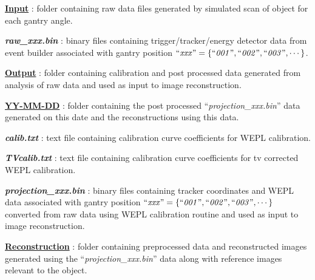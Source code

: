 \documentclass[landscape]{article}
\begin{document}
\begin{myEnumerate}[labelindent=0pt, leftmargin=*]
\begin{myEnumerate}[labelindent=1pt, leftmargin=*]
\begin{myEnumerate}[labelindent=1pt, leftmargin=*]
\begin{myEnumerate}[labelindent=1pt, leftmargin=*]
                \begin{myEnumerate}[labelindent=1pt, leftmargin=*]
                    \item \ul{\textbf{Input}} : folder containing raw data files generated by simulated scan of object for each gantry angle.
                    \begin{myEnumerate}[labelindent=1pt, leftmargin=*]
                        \item \textbf{\textit{raw\_xxx.bin}} : binary files containing trigger/tracker/energy detector data from event builder associated with gantry position $\textrm{``\textit{xxx}''} =\{\textrm{``\textit{001}''}, \textrm{``\textit{002}''}, \textrm{``\textit{003}''}, \cdots\}$.
                    \end{myEnumerate}
                    \item \ul{\textbf{Output}} : folder containing calibration and post processed data generated from analysis of raw data and used as input to image reconstruction.
                    \begin{myEnumerate}[labelindent=1pt, leftmargin=*]
                        \item \ul{\textbf{YY-MM-DD}} : folder containing the post processed ``\textit{projection\_xxx.bin}'' data generated on this date and the reconstructions using this data.
                        \begin{myEnumerate}[labelindent=1pt, leftmargin=*]
                            \item \textbf{\textit{calib.txt}} : text file containing calibration curve coefficients for WEPL calibration.
                            \item \textbf{\textit{TVcalib.txt}} : text file containing calibration curve coefficients for tv corrected WEPL calibration.
                            \item \textbf{\textit{projection\_xxx.bin}} : binary files containing tracker coordinates and WEPL data associated with gantry position $\textrm{``\textit{xxx}''} =\{\textrm{``\textit{001}''}, \textrm{``\textit{002}''}, \textrm{``\textit{003}''}, \cdots\}$ converted from raw data using WEPL calibration routine and used as input to image reconstruction.
                            \item \ul{\textbf{Reconstruction}} : folder containing preprocessed data and reconstructed images generated using the ``\textit{projection\_xxx.bin}'' data along with reference images relevant to the object.
                            \begin{myEnumerate}[labelindent=1pt, leftmargin=*]

\end{myEnumerate}
\end{myEnumerate}
\end{myEnumerate}
\end{myEnumerate}
\end{myEnumerate}
\end{myEnumerate}
\end{myEnumerate}
\end{myEnumerate}
\end{document}
